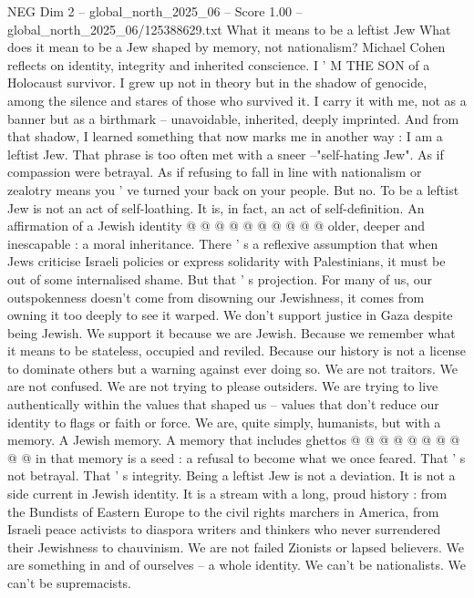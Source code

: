 \begin{textsample}{NEG Dim 2 – global\_north\_2025\_06 – Score 1.00 – global\_north\_2025\_06/125388629.txt}  \label{ex:f2_neg_223}
What it means to be a leftist Jew What does it mean to be a Jew shaped by memory, not nationalism?
Michael Cohen reflects on identity, integrity and inherited conscience.
I ' M THE SON of a Holocaust survivor.
I grew up not in theory but in the shadow of genocide, among the silence and stares of those who survived it.
I carry it with me, not as a banner but as a birthmark -- unavoidable, inherited, deeply imprinted.
And from that shadow, I learned something that now marks me in another way : I am a leftist Jew.
That phrase is too often met with a sneer --"self-hating Jew".
As if compassion were betrayal.
As if refusing to fall in line with nationalism or zealotry means you ' ve turned your back on your people.
But no.
To be a leftist Jew is not an act of self-loathing.
It is, in fact, an act of self-definition.
An affirmation of a Jewish identity @ @ @ @ @ @ @ @ @ @ older, deeper and inescapable : a moral inheritance.
There ' s a reflexive assumption that when Jews criticise Israeli policies or express solidarity with Palestinians, it must be out of some internalised shame.
But that ' s projection.
For many of us, our outspokenness doesn't come from disowning our Jewishness, it comes from owning it too deeply to see it warped.
We don't support justice in Gaza despite being Jewish.
We support it because we are Jewish.
Because we remember what it means to be stateless, occupied and reviled.
Because our history is not a license to dominate others but a warning against ever doing so.
We are not traitors.
We are not confused.
We are not trying to please outsiders.
We are trying to live authentically within the values that shaped us -- values that don't reduce our identity to flags or faith or force.
We are, quite simply, humanists, but with a memory.
A Jewish memory.
A memory that includes ghettos @ @ @ @ @ @ @ @ @ @ in that memory is a seed : a refusal to become what we once feared.
That ' s not betrayal.
That ' s integrity.
Being a leftist Jew is not a deviation.
It is not a side current in Jewish identity.
It is a stream with a long, proud history : from the Bundists of Eastern Europe to the civil rights marchers in America, from Israeli peace activists to diaspora writers and thinkers who never surrendered their Jewishness to chauvinism.
We are not failed Zionists or lapsed believers.
We are something in and of ourselves -- a whole identity.
We can't be nationalists.
We can't be supremacists.

\end{textsample}
